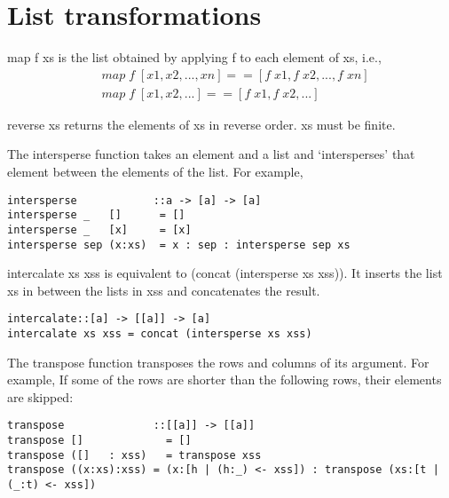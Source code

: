 \section{List transformations}

map f xs is the list obtained by applying f to each element of xs, i.e.,
\begin{align*}
	&map\; f\; [x1, x2, ..., xn] == [f\; x1, f\; x2, ..., f\; xn]\\
	&map\; f\; [x1, x2, ...] == [f\; x1, f\; x2, ...]
\end{align*}

reverse xs returns the elements of xs in reverse order. xs must be finite.

The intersperse function takes an element and a list and `intersperses' that element between the elements of the list. For example,

\begin{lstlisting}[frame=single]
intersperse            ::a -> [a] -> [a]
intersperse _   []      = []
intersperse _   [x]     = [x]
intersperse sep (x:xs)  = x : sep : intersperse sep xs
\end{lstlisting}

intercalate xs xss is equivalent to (concat (intersperse xs xss)). It inserts the list xs in between the lists in xss and concatenates the result.

\begin{lstlisting}[frame=single]
intercalate::[a] -> [[a]] -> [a]
intercalate xs xss = concat (intersperse xs xss)
\end{lstlisting}

The transpose function transposes the rows and columns of its argument. For example,
If some of the rows are shorter than the following rows, their elements are skipped:

\begin{lstlisting}[frame=single]
transpose              ::[[a]] -> [[a]]
transpose []             = []
transpose ([]   : xss)   = transpose xss
transpose ((x:xs):xss) = (x:[h | (h:_) <- xss]) : transpose (xs:[t | (_:t) <- xss])
\end{lstlisting}

